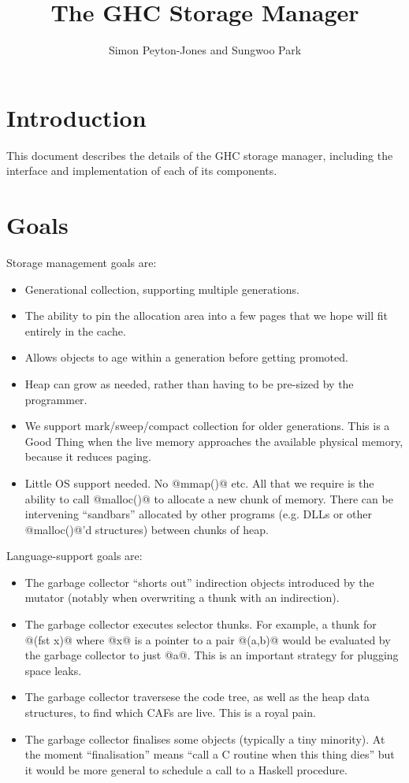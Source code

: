 \documentclass{article}
\begin{document}
\title{The GHC Storage Manager}
\author{Simon Peyton-Jones and Sungwoo Park}

\makeatactive
\maketitle
\section{Introduction}

This document describes the details of the GHC storage manager, including
the interface and implementation of each of its components.

\section{Goals}

Storage management goals are:
\begin{itemize}
\item Generational collection, supporting multiple generations.
\item The ability to pin the allocation
area into a few pages that we hope will fit entirely in the cache.
\item Allows objects to age within a generation before getting promoted.
\item Heap can grow as needed, rather than having to be pre-sized
  by the programmer.
\item We support mark/sweep/compact collection for older generations.
This is a Good Thing when the live memory approaches the available
physical memory, because it reduces paging.
\item Little OS support needed.  No @mmap()@ etc. All that we require is
  the ability to call @malloc()@ to allocate a new chunk of memory.
  There can be intervening ``sandbars'' allocated by other programs
  (e.g. DLLs or other @malloc()@'d structures) between chunks of heap.
\end{itemize}

Language-support goals are:
\begin{itemize}
\item The garbage collector ``shorts out'' indirection objects introduced
by the mutator (notably when overwriting a thunk with an indirection).
\item The garbage collector executes selector thunks.
For example, a thunk for
@(fst x)@ where @x@ is a pointer to a pair @(a,b)@ would be
evaluated by the garbage collector to just @a@.  This is an important
strategy for plugging space leaks.
\item The garbage collector traversese the code tree, as well as
the heap data structures, to find which CAFs are live. This is a royal pain.
\item The garbage collector finalises some objects (typically a tiny minority).
At the moment ``finalisation'' means ``call a C routine when this thing
dies'' but it would be more general to schedule a call to a Haskell
procedure.
\end{itemize}
\end{document}
